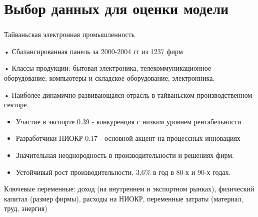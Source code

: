 \documentclass[c, dvipsnames]{beamer}  %
\begin{document}
\section{Выбор данных для оценки модели}

\begin{frame}[shrink=3]
\frametitle{\insertsection} 


Тайваньская электронная промышленность

• Сбалансированная панель за 2000-2004 гг из 1237 фирм

• Классы продукции: бытовая электроника, телекоммуникационное
оборудование, компьютеры и складское оборудование, электронника.


• Наиболее динамично развивающаяся отрасль в тайваньском производственном секторе.


\begin{itemize}
	\item  Участие в экспорте 0.39 - конкуренция с низким уровнем рентабельности
	\item  	Разработчики НИОКР 0.17 - основной акцент на процессных инновациях
	
	\item  Значительная неоднородность в производительности и решениях фирм.
	
	\item  Устойчивый рост производительности, 3,6\% в год в 80-х и 90-х годах.
	
\end{itemize}

Ключевые переменные:  доход (на внутреннем и экспортном рынках), физический капитал (размер фирмы), расходы на НИОКР, переменные затраты (материал, труд, энергия)

\end{frame}
\end{document}
